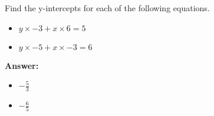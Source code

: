  Find the y-intercepts for each of the following equations. \begin{itemize}\item \( y \times -3 + x \times 6 = 5 \)\item \( y \times -5 + x \times -3 = 6 \)\end{itemize}

        \textbf{Answer:} \begin{itemize}\item \( -\frac{5}{3} \)\item \( -\frac{6}{5} \)\end{itemize}
